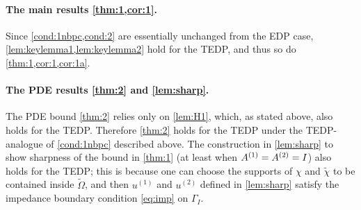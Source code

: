 \paragraph{The main results \cref{thm:1,cor:1}.}
Since \cref{cond:1nbpc,cond:2} are essentially unchanged from the EDP case, \cref{lem:keylemma1,lem:keylemma2} hold for the TEDP, and thus so do \cref{thm:1,cor:1,cor:1a}.

\paragraph{The PDE results \cref{thm:2} and \cref{lem:sharp}.}

The PDE bound \cref{thm:2} relies only on \cref{lem:H1}, which, as stated above, also holds for the TEDP. Therefore \cref{thm:2} holds for the TEDP under the TEDP-analogue of \cref{cond:1nbpc} described above. The construction in \cref{lem:sharp} to show sharpness of the bound in \cref{thm:1} (at least when ${A}^{(1)}= {A}^{(2)}= I$) also holds for the TEDP; this is because one can choose the supports of $\chi$ and $\widetilde{\chi}$ to be contained inside $\widetilde{\Omega}$, and then $u^{(1)}$ and $u^{(2)}$ defined in \cref{lem:sharp} satisfy the impedance boundary condition \cref{eq:imp} on $\Gamma_I$.




